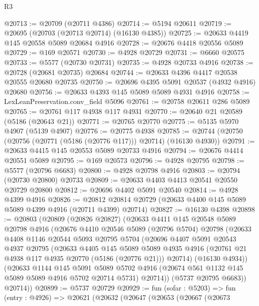\begin{lexlean}{R3}
\begin{coremodule}
@20713 := @20709 (@20711 @4386)
@20714 := @5194 @20611
@20719 := @20695 (@20703 (@20713 @20714) (@16130 @4385))
@20725 := @20633 @4419 @145 @20558 @5089 @20684 @4916
@20728 := @20676 @4418 @20556 @5089
@20729 := @169 @20571
@20730 := @4928 @20729
@20731 := @6660 @20575
@20733 := @5577 (@20730 @20731)
@20735 := @4928 @20733 @4916
@20738 := @20728 (@20681 @20735) @20684
@20744 := @20633 @4396 @4417 @20538 @20555 @20680 @20735
@20750 := @20696 @4395 @5091 @20537 (@4932 @4916) @20680
@20756 := @20633 @4393 @145 @5089 @5089 @4931 @4916
@20758 := LexLeanPreservation.conv_field @5096
@20761 := @20758 @20611 @286 @5089
@20765 := @20761 @117 @4938 @117 @4931
@20770 := @20640 @21 @20589 (@5186 (@20643 @21))
@20771 := @20765 @20770
@20775 := @5135 @5970 @4907 (@5139 @4907)
@20776 := @20775 @4938
@20785 := @20744 (@20750 (@20756 (@20771 (@5186 (@20776 @117))) @20714) (@16130 @4930))
@20791 := @20633 @4415 @145 @20553 @5089 @20733 @4916
@20794 := @20676 @4414 @20551 @5089
@20795 := @169 @20573
@20796 := @4928 @20795
@20798 := @5577 (@20796 @6683)
@20800 := @4928 @20798 @4916
@20803 := @20794 (@20730 @20800) @20733
@20809 := @20633 @4403 @4413 @20541 @20550 @20729 @20800
@20812 := @20696 @4402 @5091 @20540
@20814 := @4928 @4399 @4916
@20826 := @20812 @20814 @20729 (@20633 @4400 @145 @5089 @5089 @4399 @4916 (@20711 @4399) @20714)
@20827 := @16130 @4398
@20898 := @20803
    (@20809
      (@20826 @20827)
      (@20633
        @4411
        @145
        @20548
        @5089
        @20798
        @4916
        (@20676
          @4410
          @20546
          @5089
          (@20796 @5704)
          @20798
          (@20633
            @4408
            @1146
            @20544
            @5093
            @20795
            @5704
            (@20696
              @4407
              @5091
              @20543
              @4937
              @20795
              (@20633
                @4405
                @145
                @5089
                @5089
                @4935
                @4916
                (@20761 @21 @4938 @117 @4935 @20770 (@5186 (@20776 @21)))
                @20714)
              (@16130 @4934))
            (@20633
              @1144
              @145
              @5091
              @5089
              @5702
              @4916
              (@20674 @561 @1132 @145 @5089 @5089 @4916 @5702 @20714 @5731)
              @20714))
          (@5737 @20795 @6683))
        @20714))
@20899 := @5737 @20729
@20929 := fun (sofar : @5203) =>
  fun (entry : @4926) =>
  @20621
    (@20632
      (@20647
        (@20653
          (@20667
            (@20673

\end{coremodule}
\end{lexlean}
